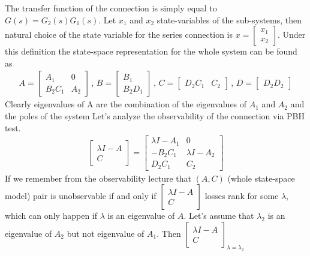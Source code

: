 \documentclass[twoside]{article}
\begin{document}
The transfer function of the connection is simply equal to $G(s) = G_2(s) G_1(s)$. Let $x_1$ and $x_2$
state-variables of the sub-systems, then natural choice of the state variable for the series connection is 
$x = \begin{bmatrix} x_1 \\ x_2 \end{bmatrix}$. Under this definition the state-space representation for the whole system 
can be found as
%
\begin{align*}
A = \left[ \begin{array}{c|c} A_1 & 0 \\ \hline B_2 C_1  & A_2 \end{array} \right]
\, , \, B = \left[ \begin{array}{c} B_1 \\ \hline B_2 D_1  \end{array} \right]
\, , \, C = \left[ \begin{array}{c|c} D_2 C_1 & C_2  \end{array} \right]
\, , \, D = \left[ \begin{array}{c} D_2  D_2  \end{array} \right]
\end{align*}
%
Clearly eigenvalues of A are the combination of the eigenvalues of $A_1$ and $A_2$ and the poles of the system 
Let's analyze the observability of the connection via PBH test. 
%
\begin{align*}
	\left[ \begin{array}{c} \lambda I - A \\ \hline C \end{array} \right]
	= 
	\left[ \begin{array}{c|c} \lambda I - A_1 & 0 \\ \hline -B_2 C_1 &  \lambda I - A_2 \\ \hline 
	D_2 C_1 & C_2
	\end{array} \right]
\end{align*}
%
If we remember from the observability lecture that $(A,C)$ (whole state-space model) pair 
is unobservable if and only if $\left[ \begin{array}{c} \lambda I - A \\ \hline C \end{array} \right]$
losses rank for some $\lambda$, which can only happen if $\lambda$ is an eigenvalue of $A$.
Let's assume that $\lambda_2$ is an eigenvalue of $A_2$ but not eigenvalue of $A_1$. 
Then $\left[ \begin{array}{c} \lambda I - A \\ \hline C \end{array} \right]_{\lambda = \lambda_2}$ 
\end{document}
